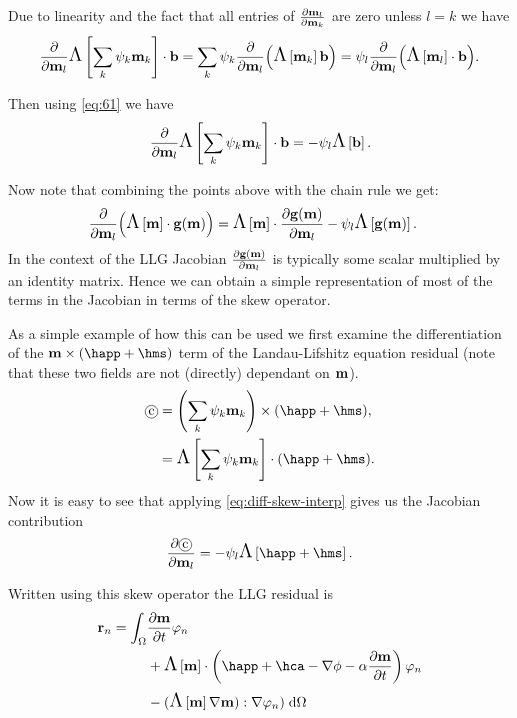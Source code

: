 \begin{itemize}
  Due to linearity and the fact that all entries of $\frac{\partial \mathbf{m}_{l}}{\partial \mathbf{m}_{k}}$ are zero unless $l=k$ we have
  \begin{equation}
    \frac{\partial }{\partial \mathbf{m}_l} \text{\Large{$\Lambda$}}\left[ \sum_{k} {\psi_k} \mathbf{m}_{k} \right] \cdot {\mathbf{b}} = \sum_k \psi_k \frac{\partial }{\partial \mathbf{m}_l} {\left( \text{\Large{$\Lambda$}}\left[ \mathbf{m}_k \right] {\mathbf{b}} \right)} = \psi_l \frac{\partial }{\partial \mathbf{m}_l} {\left( \text{\Large{$\Lambda$}}\left[ \mathbf{m}_l \right] \cdot {\mathbf{b}} \right)}.
  \end{equation}

  Then using \eqref{eq:61} we have
  \begin{equation}
    \frac{\partial }{\partial \mathbf{m}_l} \text{\Large{$\Lambda$}}\left[ \sum_{k} {\psi_k} \mathbf{m}_{k} \right] \cdot {\mathbf{b}} = - \psi_l\text{\Large{$\Lambda$}}\left[ {\mathbf{b}} \right].
    \label{eq:diff-skew-interp}
  \end{equation}

\end{itemize}

Now note that combining the points above with the chain rule we get:
  \begin{equation}
    \begin{aligned}
      \frac{\partial }{\partial \mathbf{m}_l} {\left( \text{\Large{$\Lambda$}}\left[ \mathbf{m} \right]\cdot {\mathbf{g}}(\mathbf{m}) \right)} 
      &= \text{\Large{$\Lambda$}}\left[ \mathbf{m} \right]\cdot \frac{\partial {\mathbf{g}}(\mathbf{m})}{\partial \mathbf{m}_l} - \psi_l \text{\Large{$\Lambda$}}\left[ {\mathbf{g}}(\mathbf{m}) \right].
    \end{aligned}
  \end{equation}
In the context of the LLG Jacobian $\frac{\partial {\mathbf{g}}(\mathbf{m})}{\partial \mathbf{m}_l}$ is typically some scalar multiplied by an identity matrix.
Hence we can obtain a simple representation of most of the terms in the Jacobian in terms of the skew operator.

As a simple example of how this can be used we first examine the differentiation of the $\mv \times (\happ + \hms)$ term of the Landau-Lifshitz equation residual (note that these two fields are not (directly) dependant on $\mathbf{m}$).
\begin{align}
  \circled{c} &= \intpb{\mv} \times (\happ + \hms), \notag\\
              &= \skewm{\intp{\mv}} \cdot (\happ + \hms).
\end{align}
Now it is easy to see that applying \eqref{eq:diff-skew-interp} gives us the Jacobian contribution
\begin{align}
  \pd{\circled{c}}{\mv_l} = - \sbf_l \skewm{\happ + \hms}.
\end{align}

Written using this skew operator the LLG residual is
\begin{equation}
  \begin{aligned}
    \rllg_n = \int_{\magd}
      & \dmdt \tbf_n \\
      &+ \skewm{\mv} \cdot \left( \happ + \hca - \nabla \phi - \dampc \dmdt
        \right) \tbf_n \\
      &- (\skewm{\mv} \grad \mv) : \grad \tbf_n)
      \d\magd
  \end{aligned}
\end{equation} 


